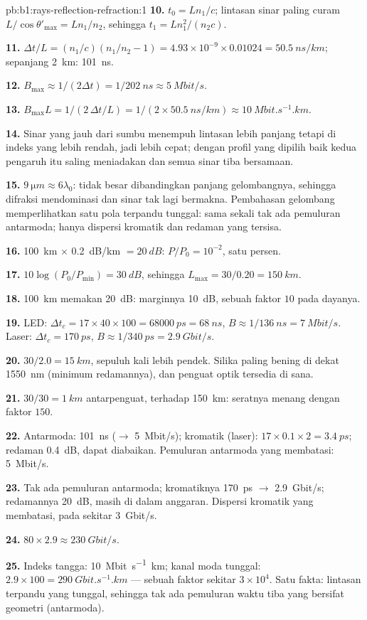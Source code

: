 \begin{solution}{pb:b1:rays-reflection-refraction:1}
\textbf{10.} $t_0 = Ln_1/c$; lintasan sinar paling curam $L/\cos\theta'_{\max} =
Ln_1/n_2$, sehingga $t_1 = Ln_1^2/(n_2 c)$.

\textbf{11.} $\Delta t/L = (n_1/c)(n_1/n_2 - 1) = 4.93\times10^{-9} \times
0.01024 = \qty{50.5}{ns/km}$; sepanjang \qty{2}{km}: \qty{101}{ns}.

\textbf{12.} $B_{\max} \approx 1/(2\Delta t) = 1/\qty{202}{ns} \approx
\qty{5}{Mbit/s}$.

\textbf{13.} $B_{\max} L = 1/(2\,\Delta t/L) = 1/(2 \times
\qty{50.5}{ns/km}) \approx \qty{10}{Mbit.s^{-1}.km}$.

\textbf{14.} Sinar yang jauh dari sumbu menempuh lintasan lebih panjang
tetapi di indeks yang lebih rendah, jadi lebih cepat; dengan profil yang
dipilih baik kedua pengaruh itu saling meniadakan dan semua sinar tiba bersamaan.

\textbf{15.} $\qty{9}{\micro m} \approx 6\lambda_0$:  tidak
besar dibandingkan panjang gelombangnya, sehingga difraksi mendominasi
dan sinar tak lagi bermakna. Pembahasan gelombang memperlihatkan satu
pola terpandu tunggal: sama sekali tak ada pemuluran antarmoda; hanya
dispersi kromatik dan redaman yang tersisa.

\textbf{16.} \qty{100}{km} $\times$ \qty{0.2}{dB/km} $= \qty{20}{dB}$:
$P/P_0 = 10^{-2}$, satu persen.

\textbf{17.} $10\log(P_0/P_{\min}) = \qty{30}{dB}$, sehingga $L_{\max} =
30/0.20 = \qty{150}{km}$.

\textbf{18.} \qty{100}{km} memakan \qty{20}{dB}: marginnya \qty{10}{dB},
sebuah faktor $10$ pada dayanya.

\textbf{19.} LED: $\Delta t_c = 17 \times 40 \times 100 = \qty{68000}{ps}
= \qty{68}{ns}$, $B \approx 1/\qty{136}{ns} = \qty{7}{Mbit/s}$. Laser:
$\Delta t_c = \qty{170}{ps}$, $B \approx 1/\qty{340}{ps} =
\qty{2.9}{Gbit/s}$.

\textbf{20.} $30/2.0 = \qty{15}{km}$, sepuluh kali lebih pendek. Silika
paling bening di dekat \qty{1550}{nm} (minimum redamannya), dan penguat
optik tersedia di sana.

\textbf{21.} $30/30 = \qty{1}{km}$ antarpenguat, terhadap
\qty{150}{km}: seratnya menang dengan faktor $150$.

\textbf{22.} Antarmoda: \qty{101}{ns} ($\to$ \qty{5}{Mbit/s});
kromatik (laser): $17 \times 0.1 \times 2 = \qty{3.4}{ps}$;
redaman \qty{0.4}{dB}, dapat diabaikan. Pemuluran antarmoda yang
membatasi: \qty{5}{Mbit/s}.

\textbf{23.} Tak ada pemuluran antarmoda; kromatiknya \qty{170}{ps} $\to$
\qty{2.9}{Gbit/s}; redamannya \qty{20}{dB}, masih di dalam anggaran.
Dispersi kromatik yang membatasi, pada sekitar \qty{3}{Gbit/s}.

\textbf{24.} $80 \times 2.9 \approx \qty{230}{Gbit/s}$.

\textbf{25.} Indeks tangga: \qty{10}{Mbit.s^{-1}.km}; kanal moda tunggal:
$2.9 \times 100 = \qty{290}{Gbit.s^{-1}.km}$ --- sebuah faktor sekitar
$3\times10^4$. Satu fakta: lintasan terpandu yang tunggal, sehingga tak
ada pemuluran waktu tiba yang bersifat geometri (antarmoda).
\end{solution}
